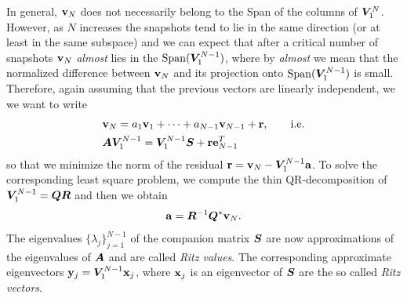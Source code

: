 In general, $\vb{v}_N$ does not necessarily belong to the Span of the columns of $\vb*{V}_1^N$. However, as $N$ increases the snapshots tend to lie in the same direction (or at least in the same subspace) and we can expect that after a critical number of snapshots $\vb{v}_N$ \emph{almost} lies in the $\mathrm{Span}{(\vb*{V}_1^{N-1})}$, where by \emph{almost} we mean that the normalized difference between $\vb{v}_N$ and its projection onto $\mathrm{Span}{(\vb*{V}_1^{N-1})}$ is small. Therefore, again assuming that the previous vectors are linearly independent, we we want to write
\begin{equation}
    \label{vn_error}
    \begin{split}
        & \vb{v}_N = a_1 \vb{v}_1 + \dots + a_{N-1} \vb{v}_{N-1} + \vb{r}, \qquad \text{i.e.}\\
        & \vb*{A}\vb*{V}_1^{N-1}  = \vb*{V}_1^{N-1}\vb*{S} + \vb{r}\vb{e}_{N-1}^T
    \end{split}
\end{equation}
so that we minimize the norm of the residual $\vb{r} = \vb{v}_N - \vb*{V}_1^{N-1}\vb{a}$. To solve the corresponding least square problem, we compute the thin QR-decomposition of $\vb*{V}_1^{N-1} = \vb*{Q}\vb*{R}$ and then we obtain
\begin{equation}
    \label{a_qrleastsquare}
    \vb{a} = \vb*{R}^{-1} \vb*{Q}^*\vb{v}_N.
\end{equation}
The eigenvalues $\{\lambda_j\}_{j = 1}^{N-1}$ of the companion matrix $\vb*{S}$ are now approximations of the eigenvalues of $\vb*{A}$ and are called \emph{Ritz values}. The corresponding approximate eigenvectors $\vb{y}_j = \vb*{V}_1^{N-1}\vb{x}_j$, where $\vb{x}_j$ is an eigenvector of $\vb*{S}$ are the so called \emph{Ritz vectors}.

